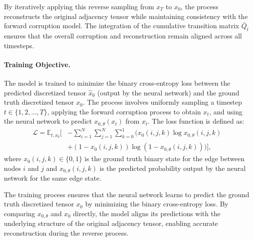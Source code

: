 By iteratively applying this reverse sampling from \(x_T\) to \(x_0\), the process reconstructs the original adjacency tensor while maintaining consistency with the forward corruption model. The integration of the cumulative transition matrix \(\bar{Q}_t\) ensures that the overall corruption and reconstruction remain aligned across all timesteps.

\paragraph{Training Objective.}  
The model is trained to minimize the binary cross-entropy loss between the predicted discretized tensor \(\hat{x}_0\) (output by the neural network) and the ground truth discretized tensor \(x_0\). The process involves uniformly sampling a timestep \(t \in \{1, 2, \dots, T\}\), applying the forward corruption process to obtain \(x_t\), and using the neural network to predict \(x_{0, \theta} (x_t)\) from \(x_t\). The loss function is defined as:
\begin{align}
\mathcal{L} = \mathbb{E}_{t, x_0} \bigg[ 
& -\sum_{i=1}^N \sum_{j=1}^N \sum_{k=0}^1 \big( 
x_0(i, j, k) \log x_{0, \theta}(i, j, k) \nonumber \\
& + (1 - x_0(i, j, k)) \log (1 - x_{0, \theta}(i, j, k)) 
\big) 
\bigg],
\end{align}
where \(x_0(i, j, k) \in \{0, 1\}\) is the ground truth binary state for the edge between nodes \(i\) and \(j\) and \(x_{0, \theta}(i, j, k)\) is the predicted probability output by the neural network for the same edge state.

The training process ensures that the neural network learns to predict the ground truth discretized tensor \(x_0\) by minimizing the binary cross-entropy loss. By comparing \(x_{0, \theta}\) and \(x_0\) directly, the model aligns its predictions with the underlying structure of the original adjacency tensor, enabling accurate reconstruction during the reverse process.
